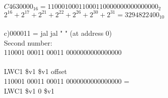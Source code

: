\documentclass[a4paper]{article}
\begin{document}
    $C4630000_{16}=11000100011000110000000000000000_{2}$\\
    $2^{16}+2^{17}+2^{21}+2^{22}+2^{26}+2^{30}+2^{31}=3294822400_{10}$\\ \\
    c)000011 = jal 
    jal " " (at address 0)\\
    Second number:\\
    110001 00011 00011 0000000000000000\\ \\
LWC1	\$v1	\$v1	offset\\
110001	00011	00011	0000000000000000 =\\
    LWC1 \$v1 0 \$v1 
\end{document}
